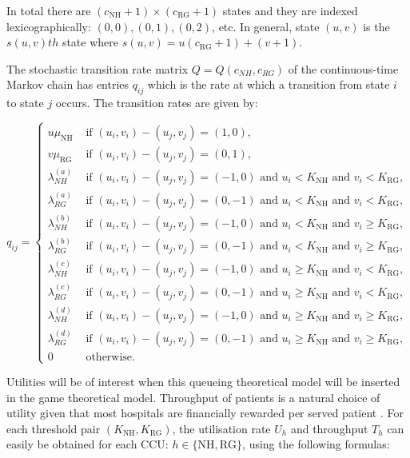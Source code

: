 \documentclass{article}
\newcommand{\NH}{\text{NH}}
\newcommand{\RG}{\text{RG}}
\begin{document}
In total there are $(c_{\NH}+1)\times(c_{\RG}+1)$ states and they are indexed lexicographically: $(0,0), (0,1), (0,2)$, etc. In general, state $(u,v)$ is the $s(u,v)th$ state where $s(u,v)=u(c_{\RG}+1)+(v+1)$.

The stochastic transition rate matrix $Q=Q(c_{NH},c_{RG})$ of the continuous-time Markov chain \cite{Stewart2009} has entries $q_{ij}$ which is the rate at which a transition from state $i$ to state $j$ occurs. The transition rates are given by:

\begin{equation}
q_{ij}=\begin{cases} u\mu_{\NH} & \text{ if  } (u_i,v_i)-(u_j,v_j)=(1,0),\\
 v\mu_{\RG} & \text{ if  } (u_i,v_i)-(u_j,v_j)=(0,1),\\
 \lambda_{NH}^{(a)} & \text{ if  } (u_i,v_i)-(u_j,v_j)=(-1,0)  \text{ and  } u_i < K_{\NH}  \text{ and  } v_i < K_{\RG},\\
 \lambda_{RG}^{(a)} & \text{ if  } (u_i,v_i)-(u_j,v_j)=(0,-1)  \text{ and  } u_i < K_{\NH}  \text{ and  } v_i < K_{\RG},\\
\lambda_{NH}^{(b)} & \text{ if  } (u_i,v_i)-(u_j,v_j)=(-1,0) \text{ and  } u_i < K_{\NH}  \text{ and  } v_i \geq K_{\RG},\\
\lambda_{RG}^{(b)} & \text{ if  } (u_i,v_i)-(u_j,v_j)=(0,-1) \text{ and  } u_i < K_{\NH}  \text{ and  } v_i \geq K_{\RG},\\
\lambda_{NH}^{(c)} & \text{ if  } (u_i,v_i)-(u_j,v_j)=(-1,0) \text{ and  } u_i \geq K_{\NH}  \text{ and  } v_i < K_{\RG},\\
\lambda_{RG}^{(c)} & \text{ if  } (u_i,v_i)-(u_j,v_j)=(0,-1) \text{ and  } u_i \geq K_{\NH}  \text{ and  } v_i < K_{\RG},\\
\lambda_{NH}^{(d)} & \text{ if  } (u_i,v_i)-(u_j,v_j)=(-1,0) \text{ and  } u_i \geq K_{\NH}  \text{ and  } v_i \geq K_{\RG},\\
\lambda_{RG}^{(d)} & \text{ if  } (u_i,v_i)-(u_j,v_j)=(0,-1) \text{ and  } u_i \geq K_{\NH}  \text{ and  } v_i \geq K_{\RG},\\
0 & \text{ otherwise}.
\end{cases}
\end{equation}

Utilities will be of interest when this queueing theoretical model will be inserted in the game theoretical model.
Throughput of patients is a natural choice of utility given that most hospitals are financially rewarded per served patient \cite{Pate2009}.
For each threshold pair $(K_{\NH},K_{\RG})$, the utilisation rate $U_h$ and throughput $T_h$ can easily be obtained for each CCU: $h\in\{\text{NH},\text{RG}\}$, using the following formulas:
\end{document}
